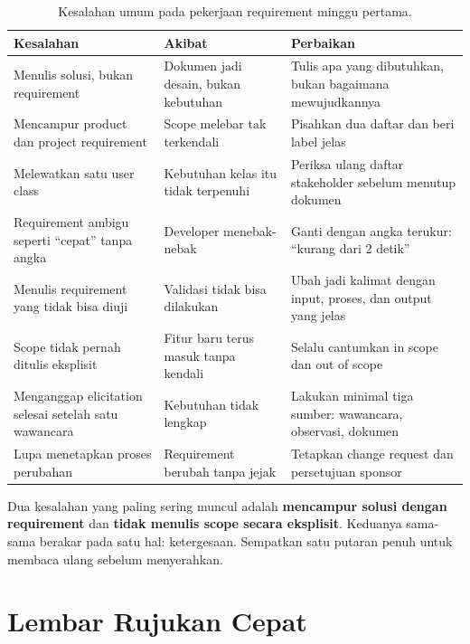 \documentclass[11pt,a4paper]{article}
\begin{document}
\begin{table}[H]
	\centering
	\caption{Kesalahan umum pada pekerjaan requirement minggu pertama.}
	\label{tab:mistakes}
	\footnotesize
	\begin{tabularx}{\textwidth}{l X X}
		\toprule
		Kesalahan                                             & Akibat                               & Perbaikan                                                     \\
		\midrule
		Menulis solusi, bukan requirement                     & Dokumen jadi desain, bukan kebutuhan & Tulis apa yang dibutuhkan, bukan bagaimana mewujudkannya      \\
		Mencampur product dan project requirement             & Scope melebar tak terkendali         & Pisahkan dua daftar dan beri label jelas                      \\
		Melewatkan satu user class                            & Kebutuhan kelas itu tidak terpenuhi  & Periksa ulang daftar stakeholder sebelum menutup dokumen      \\
		Requirement ambigu seperti ``cepat'' tanpa angka      & Developer menebak-nebak              & Ganti dengan angka terukur: ``kurang dari 2 detik''           \\
		Menulis requirement yang tidak bisa diuji             & Validasi tidak bisa dilakukan        & Ubah jadi kalimat dengan input, proses, dan output yang jelas \\
		Scope tidak pernah ditulis eksplisit                  & Fitur baru terus masuk tanpa kendali & Selalu cantumkan in scope dan out of scope                    \\
		Menganggap elicitation selesai setelah satu wawancara & Kebutuhan tidak lengkap              & Lakukan minimal tiga sumber: wawancara, observasi, dokumen    \\
		Lupa menetapkan proses perubahan                      & Requirement berubah tanpa jejak      & Tetapkan change request dan persetujuan sponsor               \\
		\bottomrule
	\end{tabularx}
\end{table}

Dua kesalahan yang paling sering muncul adalah \textbf{mencampur solusi dengan requirement} dan \textbf{tidak menulis scope secara eksplisit}. Keduanya sama-sama berakar pada satu hal: ketergesaan. Sempatkan satu putaran penuh untuk membaca ulang sebelum menyerahkan.

\section{Lembar Rujukan Cepat}
\end{document}
